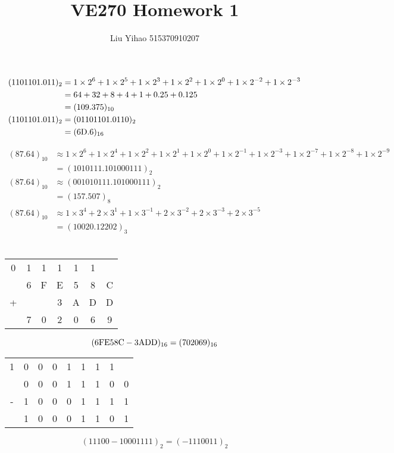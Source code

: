 \documentclass{article}
\title{VE270 Homework 1}
\author{Liu Yihao 515370910207}
\date{}
\begin{document}
\maketitle

\section{}
\begin{align*}
(1101101.011)_2
&=1\times2^6+1\times2^5+1\times2^3+1\times2^2
+1\times2^0+1\times2^{-2}+1\times2^{-3}\\
&=64+32+8+4+1+0.25+0.125\\
&=(109.375)_{10}\\
(1101101.011)_2
&=(01101101.0110)_2\\
&=\rm (6D.6)_{16}
\end{align*}

\begin{align*}
(87.64)_{10}
&\approx1\times2^6+1\times2^4+1\times2^2+1\times2^1+1\times2^0
+1\times2^{-1}+1\times2^{-3}+1\times2^{-7}+1\times2^{-8}+1\times2^{-9}\\
&=(1010111.101000111)_2\\
(87.64)_{10}
&\approx(001010111.101000111)_2\\
&=(157.507)_8\\
(87.64)_{10}
&\approx1\times3^4+2\times3^1+1\times3^{-1}+2\times3^{-2}+2\times3^{-3}
+2\times3^{-5}\\
&=(10020.12202)_3
\end{align*}

\section{}
\begin{center}
\begin{tabular}{ccccccc}
0&1&1&1&1&1\\
&6&F&E&5&8&C\\
+&&&3&A&D&D\\
\hline
&7&0&2&0&6&9
\end{tabular}
\end{center}
$$\rm(6FE58C-3ADD)_{16}=(702069)_{16}$$

\begin{center}
\begin{tabular}{ccccccccc}
1&0&0&0&1&1&1&1\\
&0&0&0&1&1&1&0&0\\
-&1&0&0&0&1&1&1&1\\
\hline
&1&0&0&0&1&1&0&1
\end{tabular}
\end{center}
$$(11100-10001111)_{2}=(-1110011)_{2}$$
\end{document}
